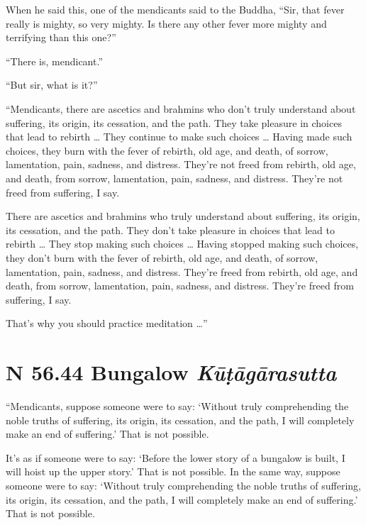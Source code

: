 \documentclass[12pt,openany]{book}%
\newcommand*{\suttatitleacronym}[1]{\smaller[2]{#1}\vspace*{.3em}}
\newcommand*{\suttatitletranslation}[1]{\linebreak{#1}}
\newcommand*{\suttatitleroot}[1]{\linebreak\smaller[2]\itshape{#1}}
\newcommand*{\tocacronym}[1]{\hspace*{-3.3em}{#1}\quad}
\newcommand*{\toctranslation}[1]{#1}
\newcommand*{\tocroot}[1]{(\textit{#1})}
\begin{document}
When he said this, one of the mendicants said to the Buddha, “Sir, that fever really is mighty, so very mighty. Is there any other fever more mighty and terrifying than this one?” 

“There is, mendicant.” 

“But sir, what is it?” 

“Mendicants, there are ascetics and brahmins who don’t truly understand about suffering, its origin, its cessation, and the path. They take pleasure in choices that lead to rebirth … They continue to make such choices … Having made such choices, they burn with the fever of rebirth, old age, and death, of sorrow, lamentation, pain, sadness, and distress. They’re not freed from rebirth, old age, and death, from sorrow, lamentation, pain, sadness, and distress. They’re not freed from suffering, I say. 

There are ascetics and brahmins who truly understand about suffering, its origin, its cessation, and the path. They don’t take pleasure in choices that lead to rebirth … They stop making such choices … Having stopped making such choices, they don’t burn with the fever of rebirth, old age, and death, of sorrow, lamentation, pain, sadness, and distress. They’re freed from rebirth, old age, and death, from sorrow, lamentation, pain, sadness, and distress. They’re freed from suffering, I say. 

That’s why you should practice meditation …” 

%
\section*{{\suttatitleacronym SN 56.44}{\suttatitletranslation A Bungalow }{\suttatitleroot Kūṭāgārasutta}}
\addcontentsline{toc}{section}{\tocacronym{SN 56.44} \toctranslation{A Bungalow } \tocroot{Kūṭāgārasutta}}

“Mendicants, suppose someone were to say: ‘Without truly comprehending the noble truths of suffering, its origin, its cessation, and the path, I will completely make an end of suffering.’ That is not possible. 

It’s as if someone were to say: ‘Before the lower story of a bungalow is built, I will hoist up the upper story.’ That is not possible. In the same way, suppose someone were to say: ‘Without truly comprehending the noble truths of suffering, its origin, its cessation, and the path, I will completely make an end of suffering.’ That is not possible. 
\end{document}
